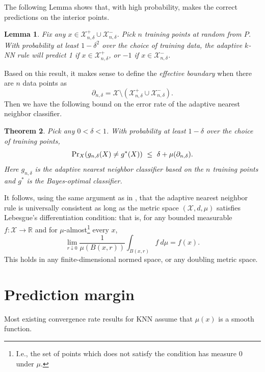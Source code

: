 \documentclass{article}
\def\R{{\mathbb{R}}}
\def\pr{{\rm Pr}}
\def\X{{\mathcal X}}
\newtheorem{theorem}{Theorem}
\newtheorem{lemma}[theorem]{Lemma}
\newcommand{\comment}[3]{}  %
\newcommand{\shay}[1]{\comment{purple}{Shay}{#1}}
\begin{document}
The following Lemma shows that, with high probability, \ouralg makes
the correct predictions on the interior points.
\begin{lemma}
Fix any $x \in \X^+_{n,\delta} \cup \X^-_{n,\delta}$. Pick $n$
training points at random from $P$. With probability at least
$1-\delta^2$ over the choice of training data, the adaptive $k$-NN
rule will predict 1 if $x \in \X^+_{n,\delta}$, or $-1$ if $x \in
\X^-_{n,\delta}$.
\label{lemma:good-sets}
\end{lemma}

Based on this result, it makes sense to define the {\it effective boundary} when there are $n$ data points as 
$$ \partial_{n,\delta} = \X \setminus (\X^+_{n,\delta} \cup \X^-_{n,\delta}) .$$
Then we have the following bound on the error rate of the adaptive nearest neighbor classifier.
\begin{theorem}
Pick any $0 < \delta < 1$. With probability at least $1-\delta$ over the choice of training points,
$$ \pr_{X}(g_{n,\delta}(X) \neq g^*(X)) \ \leq \ \delta + \mu(\partial_{n,\delta}) .$$
Here $g_{n,\delta}$ is the adaptive nearest neighbor classifier based on the $n$ training points and $g^*$ is the Bayes-optimal classifier. \shay{The quantification over $\delta$ confuses me; note that the adaptive nearest neighbor classifier $g_{n,\delta}$ gets $\delta$ as an input (because the threshold $\Delta(n,k)$ does).} 
\label{thm:general-error-bound}
\end{theorem}

It follows, using the same argument as in \cite{ChaudhuriDasgupta2014}, that the adaptive nearest neighbor rule is universally consistent as long as the metric space $(\X, d, \mu)$ satisfies Lebesgue's differentiation condition: that is, for any bounded measurable $f: \X \rightarrow \R$ and for $\mu$-almost\footnote{I.e., the set of points which does not satisfy the condition has measure $0$ under $\mu$.} every $x$,
$$ \lim_{r \downarrow 0} \frac{1}{\mu(B(x,r))} \int_{B(x,r)} f \ d\mu = f(x) .$$
This holds in any finite-dimensional normed space, or any doubling metric space.
\shay{In order for consistency to hold, 
one should tune $\delta= \delta(n)$ such that $\delta(n)\to_{n\to\infty} 0$.
(note that $\delta$ is a parameter of our algorithm, unlike in \cite{ChaudhuriDasgupta2014}, where $\delta$
was just defined for sake of analysis). }

\section{Prediction margin}
Most existing convergence rate results for KNN assume that $\mu(x)$ is
a smooth function.
\end{document}
